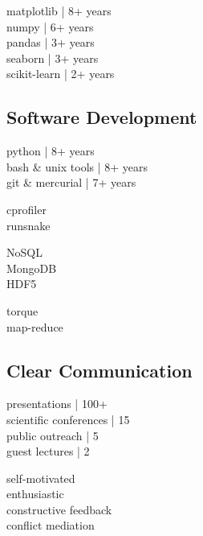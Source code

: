 \documentclass[]{winter-resume-openfont}
\begin{document}
\begin{minipage}[t]{0.3\textwidth}
\textbullet{} matplotlib | 8+ years \\ 
\textbullet{} numpy | 6+ years \\ 
\textbullet{} pandas | 3+ years \\ 
\textbullet{} seaborn | 3+ years \\
\textbullet{} scikit-learn | 2+ years \\
\sectionsep
\sectionsep


\subsection{Software Development}
\sectionsep

\textbullet{} python | 8+ years \\
\textbullet{}  bash \& unix tools | 8+ years \\
\textbullet{}  git \& mercurial | 7+ years \\
 \sectionsep

\textbullet{} cprofiler \\ 
\textbullet{} runsnake \\ 
\sectionsep

\textbullet{} NoSQL \\  
\textbullet{} MongoDB \\
\textbullet{} HDF5 \\ 
\sectionsep

\textbullet{} torque \\
\textbullet{} map-reduce \\

\sectionsep
\sectionsep

\subsection{Clear Communication}
\sectionsep

\textbullet{} presentations | 100+  \\
\textbullet{} scientific conferences | 15 \\
\textbullet{} public outreach | 5 \\
\textbullet{} guest lectures | 2\\
\sectionsep


\textbullet{} self-motivated\\
\textbullet{} enthusiastic\\
\textbullet{} constructive feedback\\
\textbullet{} conflict mediation \\

\sectionsep


\end{minipage} 
\end{document}
